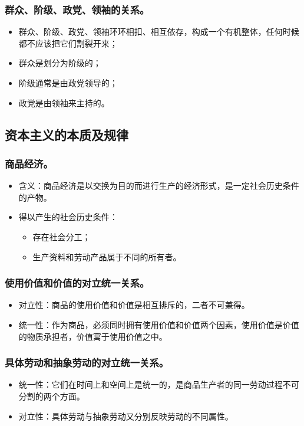 \documentclass{article}
\begin{document}
\subsubsection{群众、阶级、政党、领袖的关系。}
\begin{itemize}
    \item 群众、阶级、政党、领袖环环相扣、相互依存，构成一个有机整体，任何时候都不应该把它们割裂开来；
    \item 群众是划分为阶级的；
    \item 阶级通常是由政党领导的；
    \item 政党是由领袖来主持的。
\end{itemize}

\subsection{资本主义的本质及规律}

\subsubsection{商品经济。}
\begin{itemize}
    \item 含义：商品经济是以交换为目的而进行生产的经济形式，是一定社会历史条件的产物。
    \item 得以产生的社会历史条件：
    \begin{itemize}
        \item 存在社会分工；
        \item 生产资料和劳动产品属于不同的所有者。
    \end{itemize}
\end{itemize}

\subsubsection{使用价值和价值的对立统一关系。}
\begin{itemize}
    \item 对立性：商品的使用价值和价值是相互排斥的，二者不可兼得。
    \item 统一性：作为商品，必须同时拥有使用价值和价值两个因素，使用价值是价值的物质承担者，价值寓于使用价值之中。
\end{itemize}

\subsubsection{具体劳动和抽象劳动的对立统一关系。}
\begin{itemize}
    \item 统一性：它们在时间上和空间上是统一的，是商品生产者的同一劳动过程不可分割的两个方面。
    \item 对立性：具体劳动与抽象劳动又分别反映劳动的不同属性。
\end{itemize}
\end{document}
